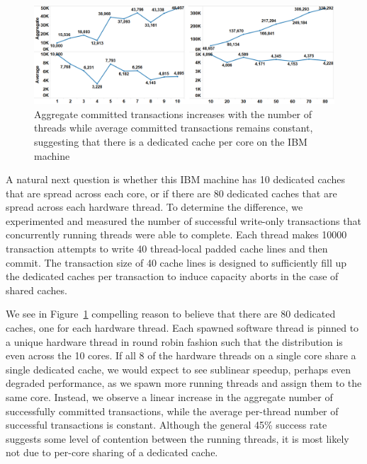 \begin{figure}[]%
\centering
{}
\includegraphics[width=\linewidth]{images/wttm_core_or_thread_ibm}
\caption{Aggregate committed transactions increases with the number of threads
while average committed transactions remains constant, suggesting that there is
a dedicated cache per core on the IBM machine}
\label{fig:wttm_core_or_thread_ibm}
\end{figure}

A natural next question is whether this IBM machine has 10 dedicated caches that
are spread across each core, or if there are 80 dedicated caches that are spread
across each hardware thread. To determine the difference, we experimented and
measured the number of successful write-only transactions that concurrently
running threads were able to complete. Each thread makes 10000 transaction
attempts to write 40 thread-local padded cache lines and then commit. The
transaction size of 40 cache lines is designed to sufficiently fill up the
dedicated caches per transaction to induce capacity aborts in the case of shared
caches.

We see in Figure~\ref{fig:wttm_core_or_thread_ibm} compelling reason to believe that
there are 80 dedicated caches, one for each hardware thread. Each spawned
software thread is pinned to a unique hardware thread in round robin fashion
such that the distribution is even across the 10 cores. If all 8 of the
hardware threads on a single core share a single dedicated cache, we would
expect to see sublinear speedup, perhaps even degraded performance, as we spawn
more running threads and assign them to the same core. Instead, we observe a
linear increase in the aggregate number of successfully committed transactions,
while the average per-thread number of successful transactions is constant.
Although the general 45\% success rate suggests some level of contention between
the running threads, it is most likely not due to per-core sharing of a
dedicated cache.
 
